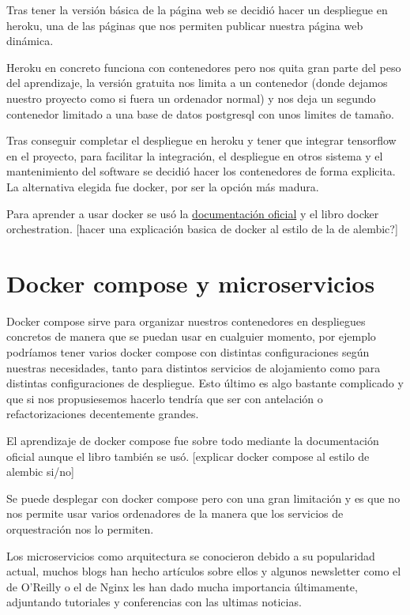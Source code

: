 Tras tener la versión básica de la página web se decidió hacer un despliegue en heroku, una de las páginas que nos permiten publicar nuestra página web dinámica. 

Heroku en concreto funciona con contenedores pero nos quita gran parte del peso del aprendizaje, la versión gratuita nos limita a un contenedor (donde dejamos nuestro proyecto como si fuera un ordenador normal) y nos deja un segundo contenedor limitado a una base de datos postgresql con unos limites de tamaño. 

Tras conseguir completar el despliegue en heroku y tener que integrar tensorflow en el proyecto, para facilitar la integración, el despliegue en otros sistema y el mantenimiento del software se decidió hacer los contenedores de forma explicita. La alternativa elegida fue docker, por ser la opción más madura. 

Para aprender a usar docker se usó la \href{https://docs.docker.com/}{documentación oficial} y el libro docker orchestration\cite{ran17}. [hacer una explicación basica de docker al estilo de la de alembic?]

\section{Docker compose y microservicios}

Docker compose sirve para organizar nuestros contenedores en despliegues concretos de manera que se puedan usar en cualguier momento, por ejemplo podríamos tener varios docker compose con distintas configuraciones según nuestras necesidades, tanto para distintos servicios de alojamiento como para distintas configuraciones de despliegue. Esto último es algo bastante complicado y que si nos propusiesemos hacerlo tendría que ser con antelación o refactorizaciones decentemente grandes.

El aprendizaje de docker compose fue sobre todo mediante la documentación oficial aunque el libro \cite{ran17} también se usó. [explicar docker compose al estilo de alembic si/no] 

Se puede desplegar con docker compose pero con una gran limitación y es que no nos permite usar varios ordenadores de la manera que los servicios de orquestración nos lo permiten.

Los microservicios como arquitectura se conocieron debido a su popularidad actual, muchos blogs han hecho artículos sobre ellos y algunos newsletter como el de O'Reilly o el de Nginx les han dado mucha importancia últimamente, adjuntando tutoriales y conferencias con las ultimas noticias.


